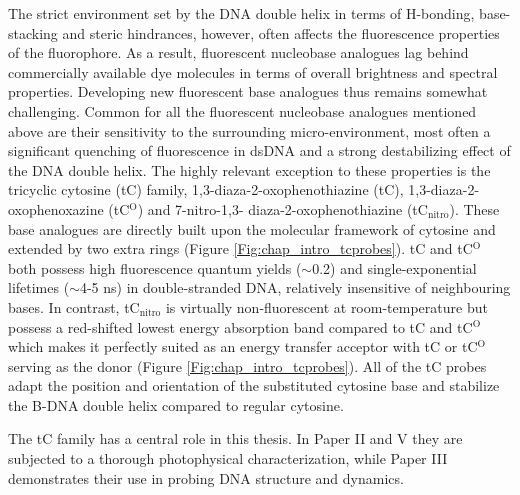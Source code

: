  The strict environment set by the DNA double helix in terms of H-bonding, base-stacking and steric hindrances, however, often affects the fluorescence properties of the fluorophore. As a result, fluorescent nucleobase analogues lag behind commercially available dye molecules in terms of overall brightness and spectral properties. Developing new fluorescent base analogues thus remains somewhat challenging. Common for all the fluorescent nucleobase analogues mentioned above are their sensitivity to the surrounding micro-environment, most often a significant quenching of fluorescence in dsDNA and a strong destabilizing effect of the DNA double helix. The highly relevant exception to these properties is the tricyclic cytosine (tC) family, 1,3-diaza-2-oxophenothiazine (tC), 1,3-diaza-2-oxophenoxazine (tC$^\mathrm{O}$) and 7-nitro-1,3- diaza-2-oxophenothiazine (tC$_\mathrm{nitro}$).\cite{Wilhelmsson2010,Wilhelmsson2001,Wilhelmsson2003,Sandin2005,Sandin2007,Sandin2008,Engman2004,Borjesson2009a,Preus2010} These base analogues are directly built upon the molecular framework of cytosine and extended by two extra rings (Figure \ref{Fig:chap_intro_tcprobes}). tC and tC$^\mathrm{O}$ both possess high fluorescence quantum yields ($\sim$0.2) and single-exponential lifetimes ($\sim$4-5 ns) in double-stranded DNA, relatively insensitive of neighbouring bases.\cite{Sandin2005,Sandin2008} In contrast, tC$_\mathrm{nitro}$ is virtually non-fluorescent at room-temperature but possess a red-shifted lowest energy absorption band compared to tC and tC$^\mathrm{O}$ which makes it perfectly suited as an energy transfer acceptor with tC or tC$^\mathrm{O}$ serving as the donor (Figure \ref{Fig:chap_intro_tcprobes}).\cite{Borjesson2009a,Preus2010} All of the tC probes adapt the position and orientation of the substituted cytosine base and stabilize the B-DNA double helix compared to regular cytosine.\cite{Engman2004,Sandin2008,Borjesson2009a}

 The tC family has a central role in this thesis. In Paper II and V they are subjected to a thorough photophysical characterization, while Paper III demonstrates their use in probing DNA structure and dynamics.

